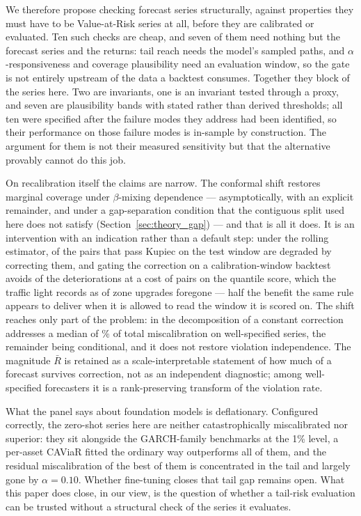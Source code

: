 \documentclass[preprint,11pt,authoryear]{elsarticle}
\newcommand{\1}{\boldsymbol{1}}
\begin{document}
We therefore propose checking forecast series structurally, against properties
they must have to be Value-at-Risk series at all, before they are calibrated or
evaluated. Ten such checks are cheap, and seven of them need nothing but the
forecast series and the returns: tail reach needs the model's sampled paths, and
$\alpha$-responsiveness and coverage plausibility need an evaluation window, so
the gate is not entirely upstream of the data a backtest consumes. Together they
block \nGateBlocked{} of the \nGateSeries{} series here. Two are invariants, one is an invariant tested through a proxy, and seven
are plausibility bands with stated rather than derived thresholds; all ten were
specified after the failure modes they address had been identified, so their
performance on those failure modes is in-sample by construction. The argument for
them is not their measured sensitivity but that the alternative provably cannot
do this job.

On recalibration itself the claims are narrow. The conformal shift restores
marginal coverage under $\beta$-mixing dependence --- asymptotically, with an
explicit remainder, and under a gap-separation condition that the contiguous
split used here does not satisfy (Section~\ref{sec:theory_gap}) --- and that
is all it does. It is an intervention with an indication rather than a default
step: under the rolling estimator, \nWellCalRollWorse{} of the \nWellCalRollN{}
pairs that pass Kupiec on the test window are degraded by correcting them, and
gating the correction on a calibration-window backtest avoids
\nGateRollAvoided{} of the \nDegradedRoll{} deteriorations at a cost of
\nGateRollUpgradesLostNet{} pairs on the quantile score, which the traffic light
records as \nGateRollUpgradesLost{} of \nGateRollUpgrades{} zone upgrades
foregone --- half the benefit the same rule appears to deliver when it is allowed
to read the window it is scored on. The shift reaches only part of the problem: in the
decomposition of \citet{gneiting2023regression} a constant correction addresses a
median of \nuMCBSharePct\% of total miscalibration on well-specified series, the
remainder being conditional, and it does not restore violation independence. The
magnitude $\bar R$ is retained as a scale-interpretable statement of how much of
a forecast survives correction, not as an independent diagnostic; among
well-specified forecasters it is a rank-preserving transform of the violation
rate.

What the panel says about foundation models is deflationary. Configured
correctly, the zero-shot series here are neither catastrophically miscalibrated
nor superior: they sit alongside the GARCH-family benchmarks at the 1\% level, a
per-asset CAViaR fitted the ordinary way outperforms all of them, and the
residual miscalibration of the best of them is concentrated in the tail and
largely gone by $\alpha = 0.10$. Whether fine-tuning closes that tail gap remains
open. What this paper does close, in our view, is the question of whether a
tail-risk evaluation can be trusted without a structural check of the series it
evaluates.
\end{document}
